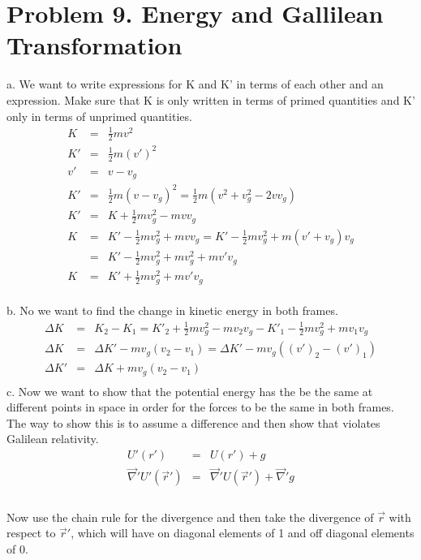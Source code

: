 \documentclass[11pt]{amsart}
\begin{document}
\section{Problem 9. Energy and Gallilean Transformation}
a. We want to write expressions for K and K' in terms of each other and an expression. Make sure that K is only written in terms of primed quantities and K' only in terms of unprimed quantities. \\
\begin{eqnarray*}
K &=& \frac{1}{2}mv^{2} \\
K' &=& \frac{1}{2}m(v')^{2} \\
v' &=& v-v_{g} \\
K' &=& \frac{1}{2}m(v-v_{g})^{2} = \frac{1}{2}m(v^{2}+v_{g}^{2}-2vv_{g}) \\
K' &=& K+\frac{1}{2}mv_{g}^{2}-mvv_{g}  \\
K &=& K'-\frac{1}{2}mv_{g}^{2}+mvv_{g} = K'-\frac{1}{2}mv_{g}^{2}+m(v'+v_{g})v_{g} \\
&=& K'-\frac{1}{2}mv_{g}^{2}+mv_{g}^{2}+mv'v_{g} \\
K &=& K'+\frac{1}{2}mv_{g}^{2}+mv'v_{g} 
\end{eqnarray*} \\
b. No we want to find the change in kinetic energy in both frames. \\
\begin{eqnarray*} 
\Delta{K} &=& K_{2}-K_{1} = K'_{2}+\frac{1}{2}mv_{g}^{2}-mv_{2}v_{g}-K'_{1}-\frac{1}{2}mv_{g}^{2}+mv_{1}v_{g} \\
\Delta{K} &=& \Delta{K'} -mv_{g}(v_{2}-v_{1}) = \Delta{K'} -mv_{g}((v')_{2}-(v')_{1}) \\
\Delta{K'} &=& \Delta{K}+mv_{g}(v_{2}-v_{1}) \\
\end{eqnarray*}
c. Now we want to show that the potential energy has the be the same at different points in space in order for the forces to be the same in both frames. The way to show this is to assume a difference and then show that violates Galilean relativity. \\
\begin{eqnarray*}
U'(r') &=& U(r')+g \\
\vec{\nabla}'U'(\vec{r}') &=& \vec{\nabla}'U(\vec{r}')+\vec{\nabla}'g \\
\end{eqnarray*} \\
Now use the chain rule for the divergence and then take the divergence of $\vec{r}$ with respect to $\vec{r}'$, which will have on diagonal elements of 1 and off diagonal elements of 0. \\
\end{document}
